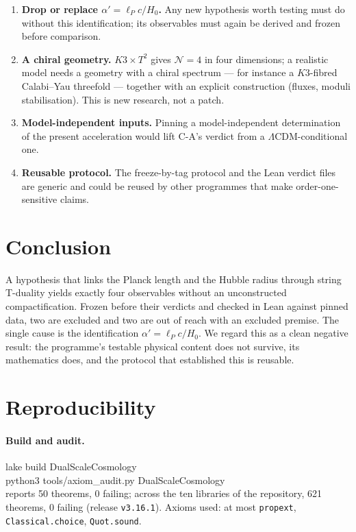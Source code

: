 \documentclass[11pt,a4paper]{article}
\theoremstyle{remark}
\begin{document}
\begin{enumerate}
\item \textbf{Drop or replace $\alpha'=\ell_Pc/H_0$.} Any new hypothesis worth testing must do without this
  identification; its observables must again be derived and frozen before comparison.
\item \textbf{A chiral geometry.} $K3\times T^2$ gives $\mathcal N=4$ in four dimensions; a realistic model needs a
  geometry with a chiral spectrum --- for instance a $K3$-fibred Calabi--Yau threefold --- together with an explicit
  construction (fluxes, moduli stabilisation). This is new research, not a patch.
\item \textbf{Model-independent inputs.} Pinning a model-independent determination of the present acceleration
  would lift C-A's verdict from a $\Lambda$CDM-conditional one.
\item \textbf{Reusable protocol.} The freeze-by-tag protocol and the Lean verdict files are generic and could be
  reused by other programmes that make order-one-sensitive claims.
\end{enumerate}

\section{Conclusion}
\label{sec:conclusion}

A hypothesis that links the Planck length and the Hubble radius through string T-duality yields exactly four
observables without an unconstructed compactification. Frozen before their verdicts and checked in Lean against
pinned data, two are excluded and two are out of reach with an excluded premise. The single cause is the
identification $\alpha'=\ell_Pc/H_0$. We regard this as a clean negative result: the programme's testable physical
content does not survive, its mathematics does, and the protocol that established this is reusable.

\appendix
\section{Reproducibility}
\label{app:repro}

\paragraph{Build and audit.}
{\footnotesize\ttfamily lake build DualScaleCosmology}\\
{\footnotesize\ttfamily python3 tools/axiom\_audit.py DualScaleCosmology}\\
reports 50 theorems, 0 failing; across the ten libraries of the repository, 621 theorems, 0 failing (release
\texttt{v3.16.1}). Axioms used: at most \texttt{propext}, \texttt{Classical.choice}, \texttt{Quot.sound}.
\end{document}
